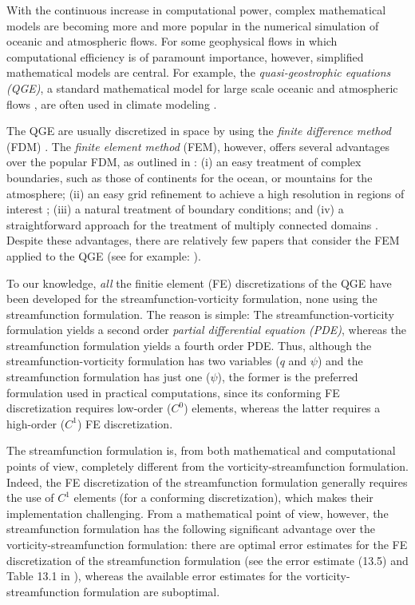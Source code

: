 With the continuous increase in computational power, complex mathematical models
are becoming more and more popular in the numerical simulation of oceanic and
atmospheric flows. For some geophysical flows in which computational efficiency
is of paramount importance, however, simplified mathematical models are central.
For example, the \emph{quasi-geostrophic equations (QGE)}, a standard
mathematical model for large scale oceanic and atmospheric flows
\cite{Cushman11,Majda,Pedlosky92,Vallis06}, are often used in climate modeling
\cite{Dijkstra05}.

The QGE are usually discretized in space by using the \emph{finite difference
method} (FDM) \cite{San11}. The \emph{finite element method} (FEM), however,
offers several advantages over the popular FDM, as outlined in \cite{Myers}: (i)
an easy treatment of complex boundaries, such as those of continents for the
ocean, or mountains for the atmosphere; (ii) an easy grid refinement to achieve
a high resolution in regions of interest \cite{Cascon}; (iii) a natural
treatment of boundary conditions; and (iv) a straightforward approach for the
treatment of multiply connected domains \cite{Myers}. Despite these advantages,
there are relatively few papers that consider the FEM applied to the QGE (see
for example: \cite{Cascon, Fix, LeProvost94, Myers, Stevens82}).

To our knowledge, \emph{all} the finitie element (FE) discretizations of the QGE have been
developed for the streamfunction-vorticity formulation, none using the
streamfunction formulation. The reason is simple: The streamfunction-vorticity
formulation yields a second order \emph{partial differential equation (PDE)},
whereas the streamfunction formulation yields a fourth order PDE. Thus, although
the streamfunction-vorticity formulation has two variables ($q$ and $\psi$) and
the streamfunction formulation has just one ($\psi$), the former is the
preferred formulation used in practical computations, since its conforming FE
discretization requires low-order ($C^0$) elements, whereas the latter requires
a high-order ($C^1$) FE discretization.

The streamfunction formulation is, from both mathematical and computational
points of view, completely different from the vorticity-streamfunction
formulation. Indeed, the FE discretization of the streamfunction formulation
generally requires the use of $C^1$ elements (for a conforming discretization),
which makes their implementation challenging. From a mathematical point of view,
however, the streamfunction formulation has the following significant advantage
over the vorticity-streamfunction formulation: there are optimal error estimates
for the FE discretization of the streamfunction formulation (see the error
estimate (13.5) and Table 13.1 in \cite{Gunzburger89}), whereas the available
error estimates for the vorticity-streamfunction formulation are suboptimal.

